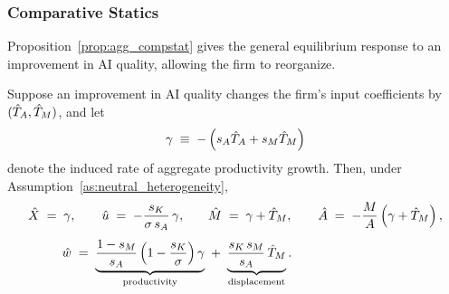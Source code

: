 \subsubsection*{Comparative Statics}

Proposition~\ref{prop:agg_compstat} gives the general equilibrium response to an improvement in AI quality, allowing the firm to reorganize.

\begin{proposition}
\label{prop:agg_compstat}
Suppose an improvement in AI quality changes the firm's input coefficients by $(\hat{T}_{A}, \hat{T}_{M})$, and let
\begin{equation}
\gamma \;\equiv\; -\left(s_{A}\hat{T}_{A} + s_{M}\hat{T}_{M}\right)
\label{eq:cs_tfp}
\end{equation}
denote the induced rate of aggregate productivity growth.
Then, under Assumption~\ref{as:neutral_heterogeneity},
\begin{align}
\hat{X} \;=\; \gamma,
\qquad
\hat{u} \;=\; -\frac{s_{K}}{\sigma\,s_{A}}\,\gamma,
\qquad
&\hat{M} \;=\; \gamma + \hat{T}_{M},
\qquad
\hat{A} \;=\; -\frac{M}{A}\left(\gamma + \hat{T}_{M}\right),
\label{eq:cs_quantities}\\[4pt]
\hat{w} \;=\; \underbrace{\frac{1-s_{M}}{s_{A}}\left(1 - \frac{s_{K}}{\sigma}\right)\gamma}_{\text{productivity}}
\;&+\;
\underbrace{\frac{s_{K}\,s_{M}}{s_{A}}\,\hat{T}_{M}}_{\text{displacement}}.
\label{eq:cs_prices}
\end{align}
\end{proposition}

